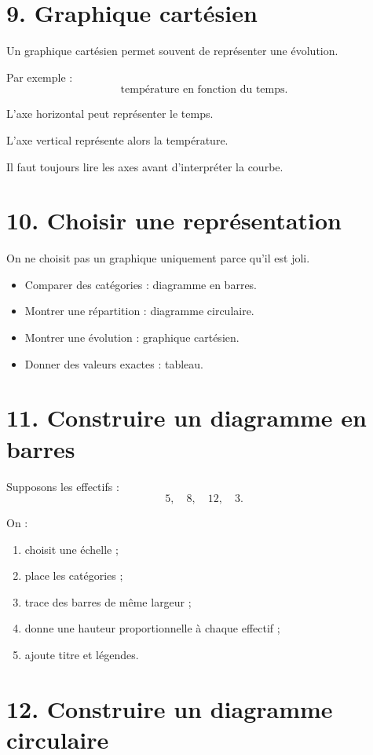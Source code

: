 \section{9. Graphique cartésien}

Un graphique cartésien permet souvent de représenter une évolution.

Par exemple :
\[
\text{température en fonction du temps}.
\]

L'axe horizontal peut représenter le temps.

L'axe vertical représente alors la température.

Il faut toujours lire les axes avant d'interpréter la courbe.

\section{10. Choisir une représentation}

On ne choisit pas un graphique uniquement parce qu'il est joli.

\begin{methode}
\begin{itemize}
\item Comparer des catégories : diagramme en barres.
\item Montrer une répartition : diagramme circulaire.
\item Montrer une évolution : graphique cartésien.
\item Donner des valeurs exactes : tableau.
\end{itemize}
\end{methode}

\section{11. Construire un diagramme en barres}

Supposons les effectifs :
\[
5,\quad8,\quad12,\quad3.
\]

On :
\begin{enumerate}
\item choisit une échelle ;
\item place les catégories ;
\item trace des barres de même largeur ;
\item donne une hauteur proportionnelle à chaque effectif ;
\item ajoute titre et légendes.
\end{enumerate}

\section{12. Construire un diagramme circulaire}

